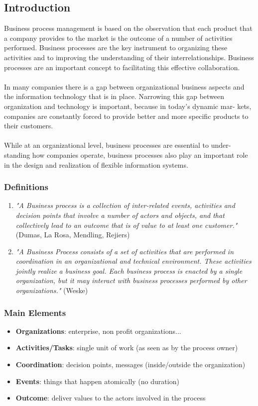 \documentclass[10pt,a4paper]{article}
\begin{document}
\subsection{Introduction}
Business process management is based on the observation that each product that a company provides to the market is the outcome of a number of activities performed. Business processes are the key instrument to organizing these activities and to improving the understanding of their interrelationships. Business processes are an important concept to facilitating this effective collaboration. \\ \\
In many companies there is a gap between organizational business aspects and the information technology that is in place. Narrowing this gap between organization and technology is important, because in today’s dynamic mar- kets, companies are constantly forced to provide better and more specific products to their customers. \\ \\
While at an organizational level, business processes are essential to under- standing how companies operate, business processes also play an important role in the design and realization of flexible information systems.
\subsubsection{Definitions}
\begin{enumerate}
	\item \textit{"A Business process is a collection of inter-related events, activities and decision points that involve a number of actors and objects, and that collectively lead to an outcome that is of value to at least one customer."} (Dumas, La Rosa, Mendling, Rejiers)
	\item \textit{"A Business Process consists of a set of activities that are performed in coordination in an organizational and technical environment. These activities jointly realize a business goal. Each business process is enacted by a single organization, but it may interact with business processes performed by other organizations."} (Weske)
\end{enumerate}
\subsubsection{Main Elements}
\begin{itemize}
	\item \textbf{Organizations}: enterprise, non profit organizations...
	\item \textbf{Activities/Tasks}: single unit of work (as seen as by the process owner)
	\item \textbf{Coordination}: decision points, messages (inside/outside the organization)
	\item \textbf{Events}: things that happen atomically (no duration)
	\item \textbf{Outcome}: deliver values to the actors involved in the process
\end{itemize}
\pagebreak
\end{document}
